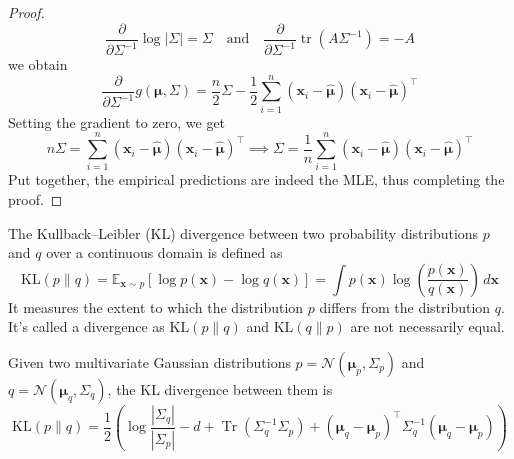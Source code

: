 \begin{proof}
    \[
    \frac{\partial}{\partial \Sigma^{-1}} \log |\Sigma| = \Sigma
    \quad \text{and} \quad
    \frac{\partial}{\partial \Sigma^{-1}} \operatorname{tr}(A\Sigma^{-1}) = -A
    \]
    we obtain
    \[
    \frac{\partial}{\partial \Sigma^{-1}} g(\boldsymbol{\mu},\Sigma) = \frac{n}{2}\Sigma - \frac{1}{2}\sum_{i=1}^n (\mathbf{x}_i - \hat{\boldsymbol{\mu}})(\mathbf{x}_i - \hat{\boldsymbol{\mu}})^\top
    \]
    Setting the gradient to zero, we get
    \[
    n\Sigma = \sum_{i=1}^n (\mathbf{x}_i - \hat{\boldsymbol{\mu}})(\mathbf{x}_i - \hat{\boldsymbol{\mu}})^\top
    \implies
    \Sigma = \frac{1}{n} \sum_{i=1}^n (\mathbf{x}_i - \hat{\boldsymbol{\mu}})(\mathbf{x}_i - \hat{\boldsymbol{\mu}})^\top
    \]
    Put together, the empirical predictions are indeed the MLE, thus completing the proof.
\end{proof}

\begin{definition}
    The Kullback–Leibler (KL) divergence between two probability distributions $p$ and $q$ over a continuous domain is defined as
    \[
    \mathrm{KL}(p\|q) = \mathbb{E}_{\mathbf{x}\sim p} \left[ \log p(\mathbf{x}) - \log q(\mathbf{x}) \right] = \int p(\mathbf{x}) \log\left( \frac{p(\mathbf{x})}{q(\mathbf{x})} \right) \, d\mathbf{x}
    \]
    It measures the extent to which the distribution $p$ differs from the distribution $q$. It's called a divergence as $\mathrm{KL}(p\|q)$ and $\mathrm{KL}(q\|p)$ are not necessarily equal.
\end{definition}

\begin{theorem}
    Given two multivariate Gaussian distributions $p=\mathcal{N}(\boldsymbol{\mu}_p,\Sigma_p)$ and $q=\mathcal{N}(\boldsymbol{\mu}_q,\Sigma_q)$, the KL divergence between them is
    \[
    \mathrm{KL}(p\|q) = \frac{1}{2} \left( \log\frac{|\Sigma_q|}{|\Sigma_p|} - d + \operatorname{Tr}(\Sigma_q^{-1}\Sigma_p) + (\boldsymbol{\mu}_q - \boldsymbol{\mu}_p)^\top \Sigma_q^{-1} (\boldsymbol{\mu}_q - \boldsymbol{\mu}_p) \right)
    \]
\end{theorem}

